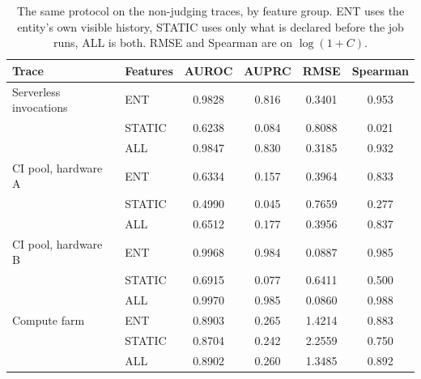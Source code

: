 \documentclass[mathematics,supfile,submit,moreauthors]{Definitions/mdpi}
\newcommand{\devnum}[1]{#1}
\begin{document}
\begin{table}[H]
\centering
\caption{The same protocol on the non-judging traces, by feature group. ENT uses the
entity's own visible history, STATIC uses only what is declared before the job runs, ALL
is both. RMSE and Spearman are on $\log(1+C)$.}
\label{tab:s_pred_cross}
\small
\begin{tabular}{llcccc}
\hline
Trace & Features & AUROC & AUPRC & RMSE & Spearman \\
\hline
Serverless invocations & ENT    & \devnum{0.9828} & \devnum{0.816} & \devnum{0.3401} & \devnum{0.953} \\
                       & STATIC & \devnum{0.6238} & \devnum{0.084} & \devnum{0.8088} & \devnum{0.021} \\
                       & ALL    & \devnum{0.9847} & \devnum{0.830} & \devnum{0.3185} & \devnum{0.932} \\
CI pool, hardware A    & ENT    & \devnum{0.6334} & \devnum{0.157} & \devnum{0.3964} & \devnum{0.833} \\
                       & STATIC & \devnum{0.4990} & \devnum{0.045} & \devnum{0.7659} & \devnum{0.277} \\
                       & ALL    & \devnum{0.6512} & \devnum{0.177} & \devnum{0.3956} & \devnum{0.837} \\
CI pool, hardware B    & ENT    & \devnum{0.9968} & \devnum{0.984} & \devnum{0.0887} & \devnum{0.985} \\
                       & STATIC & \devnum{0.6915} & \devnum{0.077} & \devnum{0.6411} & \devnum{0.500} \\
                       & ALL    & \devnum{0.9970} & \devnum{0.985} & \devnum{0.0860} & \devnum{0.988} \\
Compute farm           & ENT    & \devnum{0.8903} & \devnum{0.265} & \devnum{1.4214} & \devnum{0.883} \\
                       & STATIC & \devnum{0.8704} & \devnum{0.242} & \devnum{2.2559} & \devnum{0.750} \\
                       & ALL    & \devnum{0.8902} & \devnum{0.260} & \devnum{1.3485} & \devnum{0.892} \\
\hline
\end{tabular}
\end{table}
\end{document}
